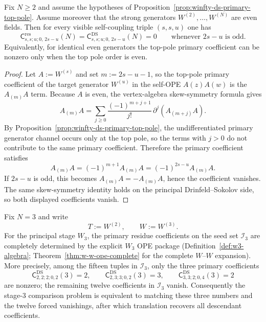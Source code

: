 \begin{proposition}
\label{prop:winfty-ds-self-ope-parity}
Fix $N \ge 2$ and assume the hypotheses of
Proposition~\ref{prop:winfty-ds-primary-top-pole}.  Assume moreover
that the strong generators $W^{(2)},\dots,W^{(N)}$ are even fields.
Then for every visible self-coupling triple $(s,s,u)$ one has
\[
\mathsf{C}^{\mathrm{res}}_{s,s;u;0,\,2s-u}(N)
=
\mathsf{C}^{\mathrm{DS}}_{s,s;u;0,\,2s-u}(N)
=0
\qquad\text{whenever } 2s-u \text{ is odd}.
\]
Equivalently, for identical even generators the top-pole primary
coefficient can be nonzero only when the top pole order is even.
\end{proposition}

\begin{proof}
Let $A:=W^{(s)}$ and set $m:=2s-u-1$, so the top-pole primary
coefficient of the target generator $W^{(u)}$ in the self-OPE
$A(z)A(w)$ is the $A_{(m)}A$ term.  Because $A$ is even, the
vertex-algebra skew-symmetry formula gives
\[
A_{(m)}A
=
\sum_{j\ge 0}\frac{(-1)^{m+j+1}}{j!}\,\partial^j(A_{(m+j)}A).
\]
By Proposition~\ref{prop:winfty-ds-primary-top-pole}, the
undifferentiated primary generator channel occurs only at the top pole,
so the terms with $j>0$ do not contribute to the same primary
coefficient.  Therefore the primary coefficient satisfies
\[
A_{(m)}A = (-1)^{m+1}A_{(m)}A = (-1)^{2s-u}A_{(m)}A.
\]
If $2s-u$ is odd, this becomes $A_{(m)}A=-A_{(m)}A$, hence the
coefficient vanishes.  The same skew-symmetry identity holds on the
principal Drinfeld--Sokolov side, so both displayed coefficients
vanish.
\end{proof}

\begin{proposition}
\label{prop:winfty-ds-stage3-explicit-packet}
Fix $N=3$ and write
\[
T:=W^{(2)},
\qquad
W:=W^{(3)}.
\]
For the principal stage $W_3$, the primary residue coefficients on the
seed set $\mathcal{I}_3$ are completely determined by the explicit
$W_3$ OPE package (Definition~\ref{def:w3-algebra};
Theorem~\ref{thm:w-w-ope-complete} for the complete $W$--$W$
expansion).
More precisely, among the fifteen tuples in $\mathcal{I}_3$, only the
three primary coefficients
\[
\mathsf{C}^{\mathrm{DS}}_{2,2;2;0,2}(3)=2,
\qquad
\mathsf{C}^{\mathrm{DS}}_{2,3;3;0,2}(3)=3,
\qquad
\mathsf{C}^{\mathrm{DS}}_{3,3;2;0,4}(3)=2
\]
are nonzero; the remaining twelve coefficients in $\mathcal{I}_3$
vanish.  Consequently the stage-$3$ comparison problem is equivalent to
matching these three numbers and the twelve forced vanishings, after
which translation recovers all descendant coefficients.
\end{proposition}

